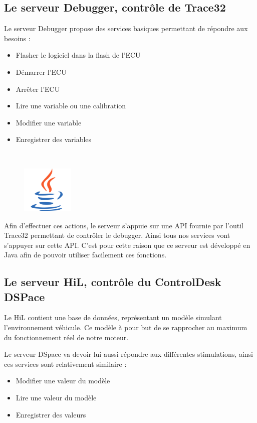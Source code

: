 \subsection{Le serveur Debugger, contrôle de Trace32}\label{T32server}
Le serveur Debugger propose des services basiques permettant de répondre aux besoins :
\begin{itemize}
	\item Flasher le logiciel dans la flash de l'ECU
	\item Démarrer l'ECU
	\item Arrêter l'ECU
	\item Lire une variable ou une calibration
	\item Modifier une variable
	\item Enregistrer des variables
\end{itemize}~

\begin{figure}
	\vspace{-40px}
	\includegraphics[width=2.5cm]{contents/images/logoJava.png}
\end{figure}
Afin d'effectuer ces actions, le serveur s'appuie sur une API fournie par l'outil Trace32 permettant de contrôler le debugger. Ainsi tous nos services vont s'appuyer sur cette API. C'est pour cette raison que ce serveur est développé en Java afin de pouvoir utiliser
facilement ces fonctions.

\subsection{Le serveur HiL, contrôle du ControlDesk DSPace}
Le HiL contient une base de données, représentant un modèle simulant l'environnement véhicule. Ce modèle à pour but de se rapprocher au maximum du fonctionnement réel de notre moteur.

Le serveur DSpace va devoir lui aussi répondre aux différentes stimulations, ainsi ces services sont relativement similaire : 
\begin{itemize}
	\item Modifier une valeur du modèle
	\item Lire une valeur du modèle
	\item Enregistrer des valeurs
\end{itemize}~


